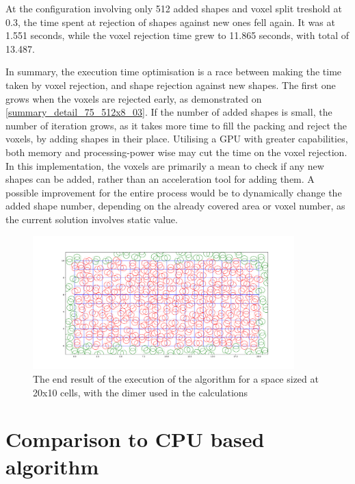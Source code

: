 \documentclass[12pt, oneside]{report}
\begin{document}
At the configuration involving only 512 added shapes and voxel split treshold at 0.3, the time spent at rejection of shapes against new ones fell again. It was at 1.551 seconds, while the voxel rejection time grew to 11.865 seconds, with total of 13.487. \newline

In summary, the execution time optimisation is a race between making the time taken by voxel rejection, and shape rejection against new shapes. The first one grows when the voxels are rejected early, as demonstrated on \ref{summary_detail_75_512x8_03}. If the number of added shapes is small, the number of iteration grows, as it takes more time to fill the packing and reject the voxels, by adding shapes in their place. Utilising a GPU with greater capabilities, both memory and processing-power wise may cut the time on the voxel rejection. \newline
In this implementation, the voxels are primarily a mean to check if any new shapes can be added, rather than an acceleration tool for adding them. A possible improvement for the entire process would be to dynamically change the added shape number, depending on the already covered area or voxel number, as the current solution involves static value.

\begin{figure}[H]
  \centering
	\label{summary_dimer_ready}
	\includegraphics[width=0.9\textwidth,keepaspectratio]{Images/SummaryOptimisation/dimer_ready.pdf}
	\caption{The end result of the execution of the algorithm for a space sized at 20x10 cells, with the dimer used in the calculations}
\end{figure}

\section{Comparison to CPU based algorithm}
\end{document}
